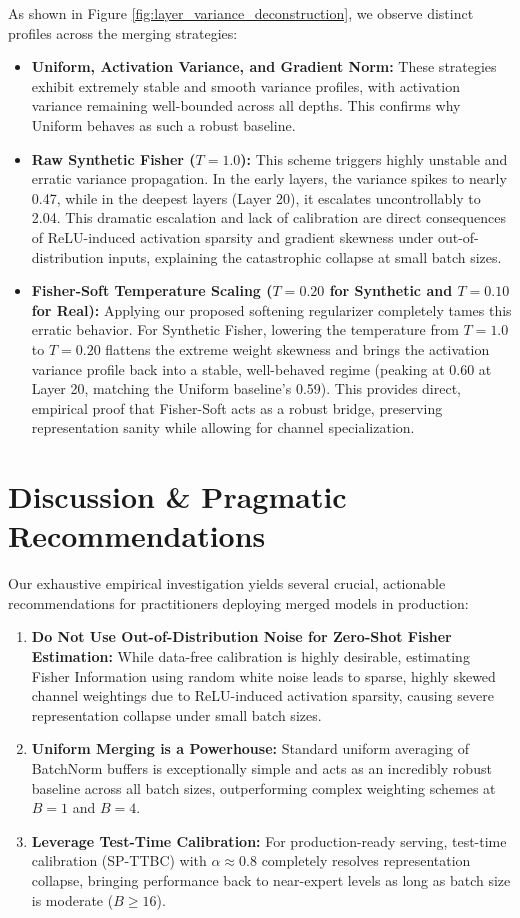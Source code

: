 \documentclass{article}
\theoremstyle{plain}
\theoremstyle{definition}
\theoremstyle{remark}
\begin{document}
As shown in Figure \ref{fig:layer_variance_deconstruction}, we observe distinct profiles across the merging strategies:
\begin{itemize}
    \item \textbf{Uniform, Activation Variance, and Gradient Norm:} These strategies exhibit extremely stable and smooth variance profiles, with activation variance remaining well-bounded across all depths. This confirms why Uniform behaves as such a robust baseline.
    \item \textbf{Raw Synthetic Fisher ($T=1.0$):} This scheme triggers highly unstable and erratic variance propagation. In the early layers, the variance spikes to nearly 0.47, while in the deepest layers (Layer 20), it escalates uncontrollably to 2.04. This dramatic escalation and lack of calibration are direct consequences of ReLU-induced activation sparsity and gradient skewness under out-of-distribution inputs, explaining the catastrophic collapse at small batch sizes.
    \item \textbf{Fisher-Soft Temperature Scaling ($T=0.20$ for Synthetic and $T=0.10$ for Real):} Applying our proposed softening regularizer completely tames this erratic behavior. For Synthetic Fisher, lowering the temperature from $T=1.0$ to $T=0.20$ flattens the extreme weight skewness and brings the activation variance profile back into a stable, well-behaved regime (peaking at 0.60 at Layer 20, matching the Uniform baseline's 0.59). This provides direct, empirical proof that Fisher-Soft acts as a robust bridge, preserving representation sanity while allowing for channel specialization.
\end{itemize}

\section{Discussion \& Pragmatic Recommendations}
Our exhaustive empirical investigation yields several crucial, actionable recommendations for practitioners deploying merged models in production:
\begin{enumerate}
    \item \textbf{Do Not Use Out-of-Distribution Noise for Zero-Shot Fisher Estimation:} While data-free calibration is highly desirable, estimating Fisher Information using random white noise leads to sparse, highly skewed channel weightings due to ReLU-induced activation sparsity, causing severe representation collapse under small batch sizes.
    \item \textbf{Uniform Merging is a Powerhouse:} Standard uniform averaging of BatchNorm buffers is exceptionally simple and acts as an incredibly robust baseline across all batch sizes, outperforming complex weighting schemes at $B=1$ and $B=4$.
    \item \textbf{Leverage Test-Time Calibration:} For production-ready serving, test-time calibration (SP-TTBC) with $\alpha \approx 0.8$ completely resolves representation collapse, bringing performance back to near-expert levels as long as batch size is moderate ($B \ge 16$).
\end{enumerate}
\end{document}
